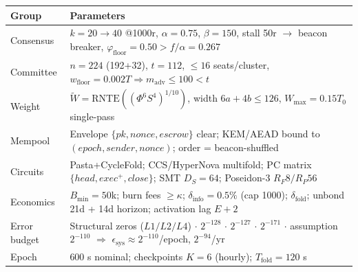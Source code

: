 \documentclass[11pt, a4paper]{article}
\begin{document}
\begin{center}
\begin{longtable}{l|l}
\textbf{Group} & \textbf{Parameters} \\
\hline
Consensus & $k=20 \to 40$ @1000r, $\alpha=0.75$, $\beta=150$, stall 50r $\to$ beacon breaker, $\varphi_{\text{floor}}=0.50 > f/\alpha=0.267$ \\
Committee & $n=224$ (192+32), $t = 112$, $\le 16$ seats/cluster, $w_{\text{floor}}=0.002T \Rightarrow m_{\text{adv}} \le 100 < t$ \\
Weight & $\tilde{W} = \text{RNTE}((\Phi^6 S^4)^{1/10})$, width $6a+4b \le 126$, $W_{\max}=0.15 T_0$ single-pass \\
Mempool & Envelope $\{pk, nonce, escrow\}$ clear; KEM/AEAD bound to $(epoch, sender, nonce)$; order = beacon-shuffled \\
Circuits & Pasta+CycleFold; CCS/HyperNova multifold; PC matrix $\{head, exec^+, close\}$; SMT $D_S=64$; Poseidon-3 $R_F8/R_P56$ \\
Economics & $B_{\min}=50$k; burn fees $\ge \kappa$; $\delta_{\text{info}}=0.5\%$ (cap 1000); $\delta_{\text{fold}}$; unbond 21d + 14d horizon; activation lag $E+2$ \\
Error budget & Structural zeros ($L1/L2/L4$) $\cdot$ $2^{-128}$ $\cdot$ $2^{-127}$ $\cdot$ $2^{-171}$ $\cdot$ assumption $2^{-110}$ $\Rightarrow$ $\epsilon_{\text{sys}} \approx 2^{-110}$/epoch, $2^{-94}$/yr \\
Epoch & 600 s nominal; checkpoints $K=6$ (hourly); $T_{\text{fold}} = 120$ s \\
\end{longtable}
\end{center}

\end{document}
